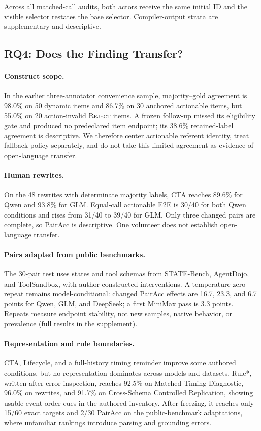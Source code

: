 \documentclass[letterpaper]{article}
\newcommand{\PrimaryDiagnostic}{Matched Timing Diagnostic}
\newcommand{\NewSchemaReplication}{Cross-Schema Controlled Replication}
\begin{document}
Across all matched-call audits, both actors receive the same initial ID and the visible selector
restates the base selector. Compiler-output strata are supplementary and descriptive.

\subsection{RQ4: Does the Finding Transfer?}

\paragraph{Construct scope.}
In the earlier three-annotator convenience sample, majority--gold agreement is 98.0\% on 50 dynamic
items and 86.7\% on 30 anchored actionable items, but 55.0\% on 20 action-invalid \textsc{Reject}
items. A frozen follow-up missed its eligibility gate and produced no predeclared item endpoint;
its 38.6\% retained-label agreement is descriptive. We therefore center actionable referent
identity, treat fallback policy separately, and do not take this limited agreement as evidence of
open-language transfer.

\paragraph{Human rewrites.}
On the 48 rewrites with determinate majority labels, CTA reaches 89.6\% for Qwen and 93.8\% for GLM.
Equal-call actionable E2E is 30/40 for both Qwen conditions and rises from 31/40 to 39/40 for GLM.
Only three changed pairs are complete, so PairAcc is descriptive. One volunteer does not establish
open-language transfer.

\paragraph{Pairs adapted from public benchmarks.}
The 30-pair test uses states and tool schemas from STATE-Bench, AgentDojo, and ToolSandbox, with
author-constructed interventions. A temperature-zero repeat remains model-conditional: changed
PairAcc effects are 16.7, 23.3, and 6.7 points for Qwen, GLM, and DeepSeek; a first MiniMax pass is
3.3 points. Repeats measure endpoint stability, not new samples, native behavior, or prevalence
(full results in the supplement).

\paragraph{Representation and rule boundaries.}
CTA, Lifecycle, and a full-history timing reminder improve some authored conditions, but no
representation dominates across models and datasets. Rule*, written after error inspection,
reaches 92.5\% on \PrimaryDiagnostic{}, 96.0\% on rewrites, and 91.7\% on
\NewSchemaReplication{}, showing usable event-order cues in the authored inventory. After freezing,
it reaches only 15/60 exact targets and 2/30 PairAcc on the public-benchmark adaptations, where
unfamiliar rankings introduce parsing and grounding errors.
\end{document}
